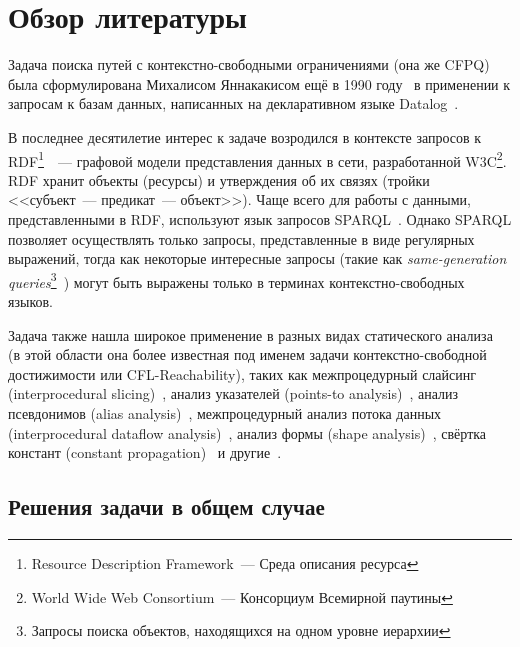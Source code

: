 \section{Обзор литературы}\label{section:voda}

Задача поиска путей с контекстно-свободными ограничениями (она же CFPQ) была сформулирована Михалисом Яннакакисом ещё в 1990 году~\cite{Yannakakis1990} в применении к запросам к базам данных, написанных на декларативном языке Datalog~\cite{DatalogWiki, Ceri1989}.

В последнее десятилетие интерес к задаче возродился в контексте запросов к RDF\footnote{Resource Description Framework~--- Среда описания ресурса}~\cite{RDF}~--- графовой модели представления данных в сети, разработанной W3C\footnote{World Wide Web Consortium~--- Консорциум Всемирной паутины}. RDF хранит объекты (ресурсы) и утверждения об их связях (тройки <<субъект~--- предикат~--- объект>>). Чаще всего для работы с данными, представленными в RDF, используют язык запросов SPARQL~\cite{SPARQL}. Однако SPARQL позволяет осуществлять только запросы, представленные в виде регулярных выражений, тогда как некоторые интересные запросы (такие как \textit{same-generation queries}\footnote{Запросы поиска объектов, находящихся на одном уровне иерархии}~\cite{Abiteboul1995}) могут быть выражены только в терминах контекстно-свободных языков.

Задача также нашла широкое применение в разных видах статического анализа~\cite{Reps1998} (в этой области она более известная под именем задачи контекстно-свободной достижимости или CFL-Reachability), таких как межпроцедурный слайсинг (interprocedural slicing)~\cite{Reps1994},  анализ указателей (points-to analysis)~\cite{Sridharan06, Xu09}, анализ псевдонимов (alias analysis)~\cite{Zheng08, Yan11, Zhang13}, межпроцедурный анализ потока данных (interprocedural dataflow analysis)~\cite{Rehof01,Pratikakis06}, анализ формы (shape analysis)~\cite{Reps1998, Rinetzky07}, свёртка констант (constant propagation)~\cite{Sagiv1996} и другие~\cite{Pratikakis06, Milanova14, Bastani15}.



\subsection{Решения задачи в общем случае}

